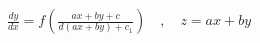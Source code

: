 \documentclass[preview]{standalone}
\begin{document}
\begin{align*}
\frac{dy}{dx}=f\left(\frac{ax+by+c}{d(ax+by)+c_1}\right)\quad,\quad z=ax+by
\end{align*}
\end{document}
